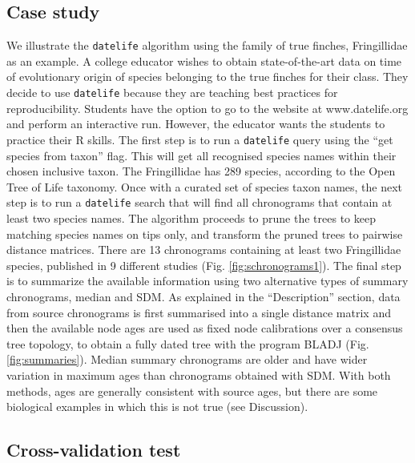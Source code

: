 \documentclass[
  english,
  man]{apa6}
\begin{document}
\hypertarget{case-study}{%
\subsection{Case study}\label{case-study}}

We illustrate the \texttt{datelife} algorithm using the family of true finches, Fringillidae as an example.
A college educator wishes to obtain state-of-the-art data on time of evolutionary origin of species belonging to the true finches for their class. They decide to use \texttt{datelife} because they are teaching best practices for reproducibility.
Students have the option to go to the website at www.datelife.org and perform an interactive run. However, the educator wants the students to practice their R skills.
The first step is to run a \texttt{datelife} query using the ``get species from taxon'' flag. This will get all recognised species names within their chosen inclusive taxon. The Fringillidae has 289 species, according to the Open Tree of Life taxonomy.
Once with a curated set of species taxon names, the next step is to run a \texttt{datelife} search that will find all chronograms that contain at least two species names. The algorithm proceeds to prune the trees to keep matching species names on tips only, and transform the pruned trees to pairwise distance matrices.
There are 13 chronograms containing at least two Fringillidae species, published in 9 different studies (Fig. \ref{fig:schronograms1}).
The final step is to summarize the available information using two alternative types of summary chronograms, median and SDM. As explained in the ``Description'' section, data from source chronograms is first summarised into a single distance matrix and then the available node ages are used as fixed node calibrations over a consensus tree topology, to obtain a fully dated tree with the program BLADJ (Fig. \ref{fig:summaries}). Median summary chronograms are older and have wider variation in maximum ages than chronograms obtained with SDM. With both methods, ages are generally consistent with source ages, but there are some biological examples in which this is not true (see Discussion).

\hypertarget{cross-validation-test}{%
\subsection{Cross-validation test}\label{cross-validation-test}}
\end{document}
